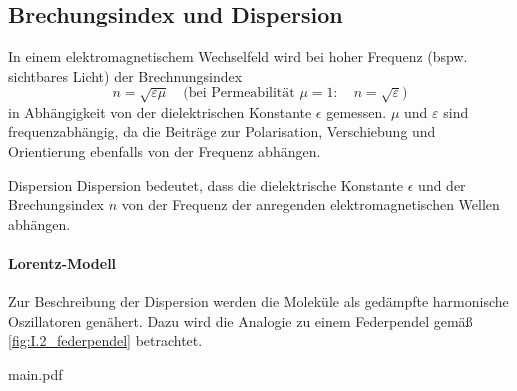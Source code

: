 \subsection{Brechungsindex und Dispersion}
    In einem elektromagnetischem Wechselfeld wird bei hoher Frequenz (bspw. sichtbares Licht) der Brechnungsindex
    $$
    n = \sqrt{ \varepsilon \mu}\quad\text{(bei Permeabilität } \mu = 1: \quad n = \sqrt{ \varepsilon }) 
    $$
    in Abhängigkeit von der dielektrischen Konstante $\epsilon$ gemessen.
    $\mu$ und $\varepsilon$ sind frequenzabhängig, da die Beiträge zur Polarisation, Verschiebung und Orientierung ebenfalls von der Frequenz abhängen.

    \begin{definition}{Dispersion}
        Dispersion bedeutet, dass die dielektrische Konstante $\epsilon$ und der Brechungsindex $n$ von der Frequenz der anregenden elektromagnetischen Wellen abhängen.
    \end{definition}
    
    \begin{minipage}{0.45\linewidth}
        \paragraph{Lorentz-Modell} Zur Beschreibung der Dispersion werden die Moleküle als gedämpfte harmonische Oszillatoren genähert. Dazu wird die Analogie zu einem Federpendel gemäß \autoref{fig:I.2_federpendel} betrachtet.\\
    \end{minipage}\hspace{0.5cm}
    \begin{minipage}{0.5\linewidth}main.pdf
        \centering
        \label{fig:I.2_federpendel}
    \end{minipage}


